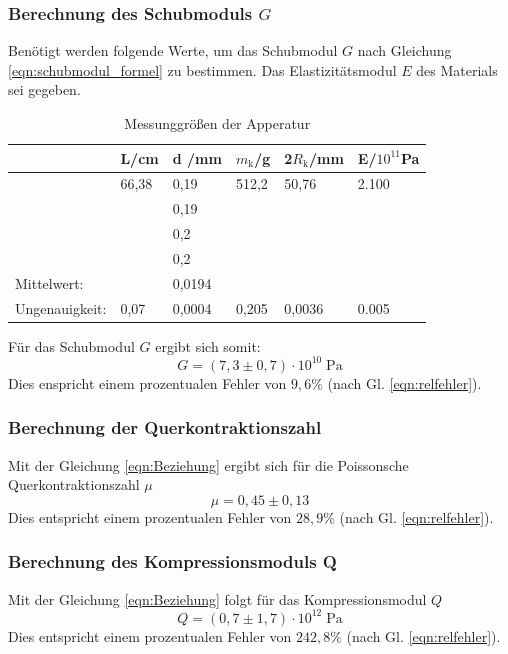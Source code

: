 \newpage
\subsubsection{Berechnung des Schubmoduls $G$}
Benötigt werden folgende Werte, um das Schubmodul $G$ nach Gleichung \ref{eqn:schubmodul_formel}
zu bestimmen.
Das Elastizitätsmodul $E$ des Materials sei gegeben.
\begin{table}
    \centering
    \label{tab:tabelle_1}
    \begin{tabular}{p{3cm} | p{1.5cm} | p{1.5cm} | p{1.5cm} | p{1.5cm} |p{1.5cm}}
    \toprule
    & L\;/\;cm & d \;/\;mm & $m_\text{k}$\;/\;g & 2$R_\text{k}$\;/\;mm & E\;/\;$10^{11}$Pa\\
    \midrule
    &66,38 & 0,19 & 512,2 &  50,76  & 2.100\\
    &      & 0,19 &       &         &\\    
    &      & 0,2  &       &         &\\
    &      & 0,2  &       &         &\\
    \midrule
    Mittelwert:    &      & 0,0194 &       &        &\\
    Ungenauigkeit: & 0,07 & 0,0004 & 0,205 & 0,0036 & 0.005\\
    \bottomrule
    \end{tabular}
    \caption{Messunggrößen der Apperatur}
    \label{tab:tabelle_2}
\end{table}

Für das Schubmodul $G$ ergibt sich somit:
\begin{equation*}
    G = (7,3 \pm 0,7 )\cdot 10^{10}\;\mathrm{Pa}
\end{equation*}
Dies enspricht einem prozentualen Fehler von $9,6\%$ (nach Gl. \ref{eqn:relfehler}).

\subsubsection{Berechnung der Querkontraktionszahl}
Mit der Gleichung \ref{eqn:Beziehung} ergibt sich für die Poissonsche Querkontraktionszahl $\mu$
\begin{equation*}
    \mu = 0,45 \pm 0,13 %
\end{equation*}
Dies entspricht einem prozentualen Fehler von $28,9\%$ (nach Gl. \ref{eqn:relfehler}).

\subsubsection{Berechnung des Kompressionsmoduls Q}
Mit der Gleichung \ref{eqn:Beziehung} 
folgt für das Kompressionsmodul $Q$
\begin{equation*}
    Q = (0,7 \pm 1,7) \cdot 10^{12} \;\mathrm{Pa}
\end{equation*}
Dies entspricht einem prozentualen Fehler von $242,8\%$ (nach Gl. \ref{eqn:relfehler}).\\

